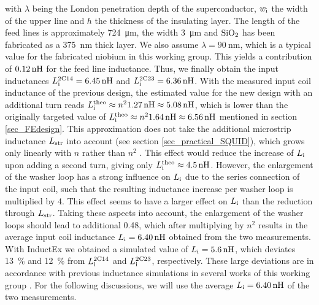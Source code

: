 with $\lambda$ being the London penetration depth of the superconductor, $w_{\rm i}$ the width of the upper line and $h$ the thickness of the insulating layer. The length of the feed lines is approximately \qty{724}{\um}, the width \qty{3}{\um} and $\rm{SiO_2}$ has been fabricated as a \qty{375}{\nm} thick layer. We also assume $\lambda=\qty{90}{\nm}$, which is a typical value for the fabricated niobium in this working group. This yields a contribution of $\qty{0.12}{\nH}$ for the feed line inductance. Thus, we finally obtain the input inductances $L_{\rm i}^{\rm 2C14}=\qty{6.45}{\nH}$ and $L_{\rm i}^{\rm 2C23}=\qty{6.36}{\nH}$. With the measured input coil inductance of the previous design, the estimated value for the new design with an additional turn reads $L_{\rm i}^{\rm theo}\approx n^{2}\qty{1.27}{\nH}\approx\qty{5.08}{\nH}$, which is lower than the originally targeted value of $L_{\rm i}^{\rm theo}\approx n^{2}\qty{1.64}{\nH}\approx\qty{6.56}{\nH}$ mentioned in section \ref{sec_FEdesign}. This approximation does not take the additional microstrip inductance $L_{\rm str}$ into account (see section \ref{sec_practical_SQUID}), which grows only linearly with $n$ rather than $n^2$ \cite{Ketchen1991}. This effect would reduce the increase of $L_{\rm i}$ upon adding a second turn, giving only $L_{\rm i}^{\rm theo}\approx\qty{4.5}{\nH}$. However, the enlargement of the washer loop has a strong influence on $L_{\rm i}$ due to the series connection of the input coil, such that the resulting inductance increase per washer loop is multiplied by 4. This effect seems to have a larger effect on $L_{\rm i}$ than the reduction through $L_{\rm str}$. Taking these aspects into account, the enlargement of the washer loops should lead to additional \qty{0.48}{\nH}, which after multiplying by $n^2$ results in the average input coil inductance $L_{\rm i}=\qty{6.40}{\nH}$ obtained from the two measurements. With InductEx we obtained a simulated value of $L_{\rm i}=\qty{5.6}{\nH}$, which deviates \qty{13}{\percent} and \qty{12}{\percent} from $L_{\rm i}^{\rm 2C14}$ and $L_{\rm i}^{\rm 2C23}$, respectively. These large deviations are in accordance with previous inductance simulations in several works of this working group \cite{Ferring2015, Bauer2022}. For the following discussions, we will use the average $L_{\rm i}=\qty{6.40}{\nH}$ of the two measurements. \\

